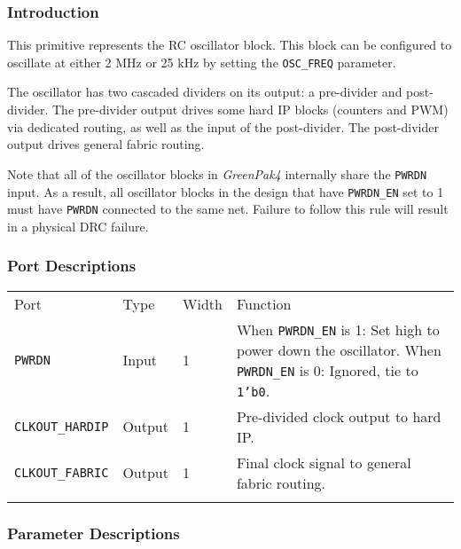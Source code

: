 \documentclass[11pt]{article}
\newcommand{\namestyle}[1]{\textit{#1}}
\newcommand{\tokenstyle}[1]{\texttt{#1}}
\newcommand{\datastyle}[1]{\texttt{#1}}
\newcommand{\whenstyle}[1]{{\fontseries{sb}\selectfont#1}}
\newcommand{\thinhline}{\Xhline{1\arrayrulewidth}}
\newcommand{\thickhline}{\Xhline{2.5\arrayrulewidth}}
\begin{document}
\subsubsection{Introduction}
This primitive represents the RC oscillator block. This block can be configured to oscillate at either 2 MHz or 25 kHz
by setting the \tokenstyle{OSC\_FREQ} parameter.

The oscillator has two cascaded dividers on its output: a pre-divider and post-divider. The pre-divider output drives
some hard IP blocks (counters and PWM) via dedicated routing, as well as the input of the post-divider. The
post-divider output drives general fabric routing.

Note that all of the oscillator blocks in \namestyle{GreenPak4} internally share the \tokenstyle{PWRDN} input. As a result, all oscillator blocks in the design that have \tokenstyle{PWRDN\_EN} set to 1 must have \tokenstyle{PWRDN} connected to the same net. Failure to follow this rule will result in a physical DRC failure.

\subsubsection{Port Descriptions}

\begin{tabularx}{\textwidth}{lllX}
\thinhline
\whenstyle{Port} & \whenstyle{Type} & \whenstyle{Width} & \whenstyle{Function} \\
\thickhline
\tokenstyle{PWRDN} & Input & 1 &
	\whenstyle{When \tokenstyle{PWRDN\_EN} is 1:} Set high to power down the oscillator. \newline
	\whenstyle{When \tokenstyle{PWRDN\_EN} is 0:} Ignored, tie to \datastyle{1'b0}.\\
\thinhline
\tokenstyle{CLKOUT\_HARDIP} & Output & 1 & Pre-divided clock output to hard IP. \\
\thinhline
\tokenstyle{CLKOUT\_FABRIC} & Output & 1 & Final clock signal to general fabric routing. \\
\thinhline
\end{tabularx}

\subsubsection{Parameter Descriptions}
\end{document}
